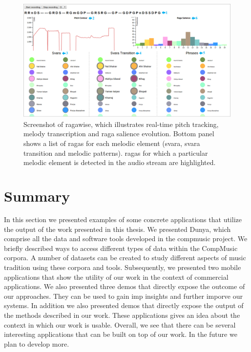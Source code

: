 \begin{figure}
	\begin{center}
		\includegraphics[width=\figSizeHundred]{ch08_applications/figures/ragawise.pdf}
	\end{center}
	\caption{Screenshot of \gls{ragawise}, which illustrates real-time pitch tracking, melody transcription and \gls{raga} salience evolution. Bottom panel shows a list of \glspl{raga} for each melodic element (\gls{svara}, \gls{svara} transition and melodic patterns). \Glspl{raga} for which a particular melodic element is detected in the audio stream are highlighted.}
	\label{fig:ragawise}
\end{figure}

%

\section{Summary}

In this section we presented examples of some concrete applications that utilize the output of the work presented in this thesis. We presented Dunya, which comprise all the data and software tools developed in the compmusic project. We briefly described ways to access different types of data within the CompMusic corpora. A number of datasets can be created to study different aspects of music tradition using these corpora and tools. Subsequently, we presented two mobile applications that show the utility of our work in the context of commercial applications. We also presented three demos that directly expose the outcome of our approaches. They can be used to gain imp insights and further imporve our systems. In addition we also presented demos that directly expose the output of the methods described in our work. These applications gives an idea about the context in which our work is usable. Overall, we see that there can be several interesting applications that can be built on top of our work. In the future we plan to develop more. 


